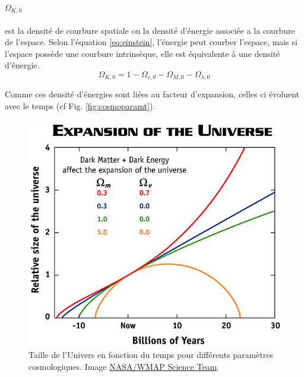 \paragraph{$\Omega_{K,0}$} est la densité de courbure spatiale ou la densité d'énergie associée a la courbure de l'espace.
Selon l’équation \ref{eq:einstein}, l'énergie peut courber l'espace, mais si l'espace possède une courbure intrinsèque, elle est équivalente à une densité d'énergie.
\begin{equation}
\Omega_{K,0} = 1 - \Omega_{r,0} - \Omega_{M,0} - \Omega_{\lambda,0} 
\end{equation}

Comme ces densité d'énergies sont liées au facteur d'expansion, celles ci évoluent avec le temps (cf Fig. \ref{fig:cosmoparamt}).

\begin{figure}
        \includegraphics[width=.9\linewidth]{img/01/scale_t.jpg} 
        \caption[Taille de l'Univers]{Taille de l'Univers en fonction du temps pour différents paramètres cosmologiques.
		Image \href{https://map.gsfc.nasa.gov/universe/bb_concepts_exp.html}{NASA/WMAP Science Team}.
 		\label{fig:scale_t}}
\end{figure}

